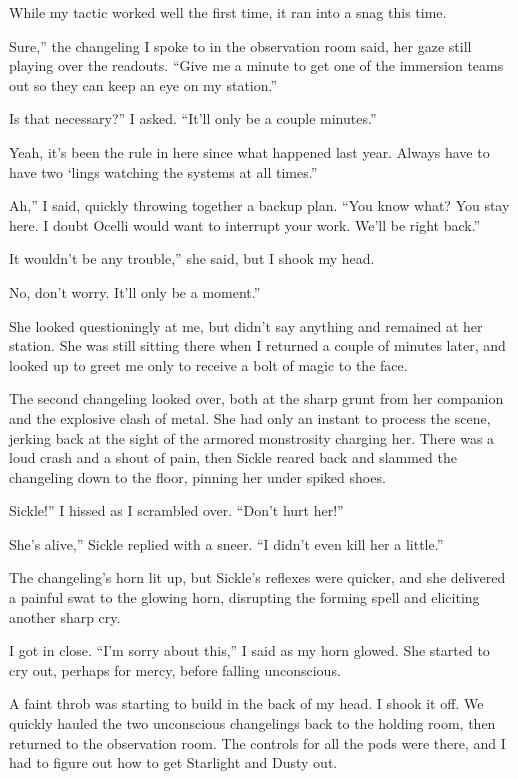 While my tactic worked well the first time, it ran into a snag this time.

\leavevmode{}Sure,” the changeling I spoke to in the observation room said, her gaze still playing over the readouts. “Give me a minute to get one of the immersion teams out so they can keep an eye on my station.”

\leavevmode{}Is that necessary?” I asked. “It’ll only be a couple minutes.”

\leavevmode{}Yeah, it’s been the rule in here since what happened last year. Always have to have two ‘lings watching the systems at all times.”

\leavevmode{}Ah,” I said, quickly throwing together a backup plan. “You know what? You stay here. I doubt Ocelli would want to interrupt your work. We’ll be right back.”

\leavevmode{}It wouldn’t be any trouble,” she said, but I shook my head.

\leavevmode{}No, don’t worry. It’ll only be a moment.”

She looked questioningly at me, but didn’t say anything and remained at her station. She was still sitting there when I returned a couple of minutes later, and looked up to greet me only to receive a bolt of magic to the face.

The second changeling looked over, both at the sharp grunt from her companion and the explosive clash of metal. She had only an instant to process the scene, jerking back at the sight of the armored monstrosity charging her. There was a loud crash and a shout of pain, then Sickle reared back and slammed the changeling down to the floor, pinning her under spiked shoes.

\leavevmode{}Sickle!” I hissed as I scrambled over. “Don’t hurt her!”

\leavevmode{}She’s alive,” Sickle replied with a sneer. “I didn’t even kill her a little.”

The changeling’s horn lit up, but Sickle’s reflexes were quicker, and she delivered a painful swat to the glowing horn, disrupting the forming spell and eliciting another sharp cry.

I got in close. “I’m sorry about this,” I said as my horn glowed. She started to cry out, perhaps for mercy, before falling unconscious.

A faint throb was starting to build in the back of my head. I shook it off. We quickly hauled the two unconscious changelings back to the holding room, then returned to the observation room. The controls for all the pods were there, and I had to figure out how to get Starlight and Dusty out.

